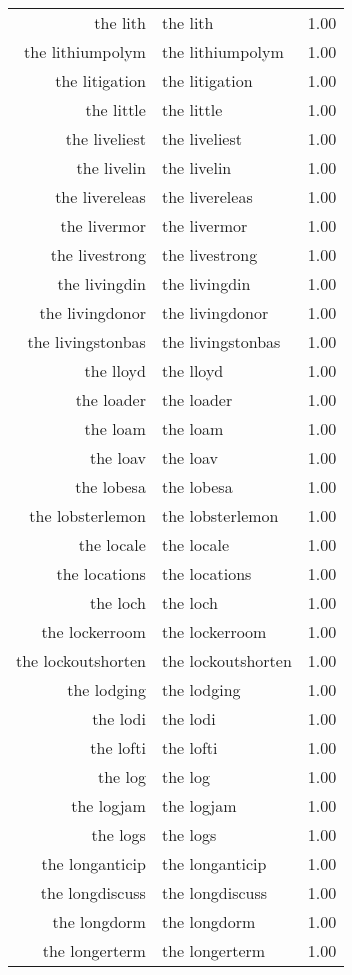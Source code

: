 \begin{table}[ht]
\begin{tabular}{rlr}
  the lith & the lith & 1.00 \\ 
  the lithiumpolym & the lithiumpolym & 1.00 \\ 
  the litigation & the litigation & 1.00 \\ 
  the little & the little & 1.00 \\ 
  the liveliest & the liveliest & 1.00 \\ 
  the livelin & the livelin & 1.00 \\ 
  the livereleas & the livereleas & 1.00 \\ 
  the livermor & the livermor & 1.00 \\ 
  the livestrong & the livestrong & 1.00 \\ 
  the livingdin & the livingdin & 1.00 \\ 
  the livingdonor & the livingdonor & 1.00 \\ 
  the livingstonbas & the livingstonbas & 1.00 \\ 
  the lloyd & the lloyd & 1.00 \\ 
  the loader & the loader & 1.00 \\ 
  the loam & the loam & 1.00 \\ 
  the loav & the loav & 1.00 \\ 
  the lobesa & the lobesa & 1.00 \\ 
  the lobsterlemon & the lobsterlemon & 1.00 \\ 
  the locale & the locale & 1.00 \\ 
  the locations & the locations & 1.00 \\ 
  the loch & the loch & 1.00 \\ 
  the lockerroom & the lockerroom & 1.00 \\ 
  the lockoutshorten & the lockoutshorten & 1.00 \\ 
  the lodging & the lodging & 1.00 \\ 
  the lodi & the lodi & 1.00 \\ 
  the lofti & the lofti & 1.00 \\ 
  the log & the log & 1.00 \\ 
  the logjam & the logjam & 1.00 \\ 
  the logs & the logs & 1.00 \\ 
  the longanticip & the longanticip & 1.00 \\ 
  the longdiscuss & the longdiscuss & 1.00 \\ 
  the longdorm & the longdorm & 1.00 \\ 
  the longerterm & the longerterm & 1.00 \\ 

\end{tabular}
\end{table}
